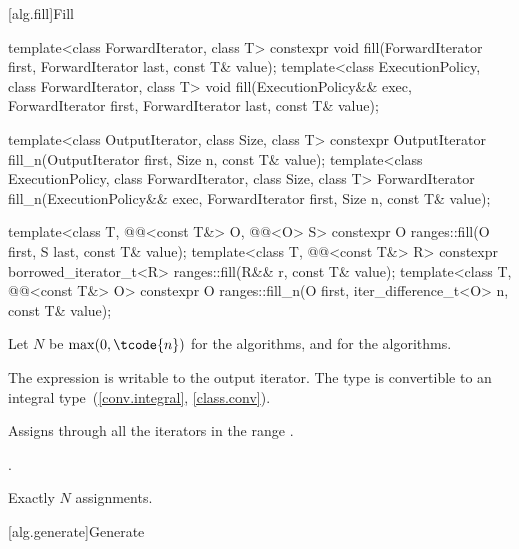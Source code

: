 [alg.fill]{Fill}

%
%
\begin{itemdecl}
template<class ForwardIterator, class T>
  constexpr void fill(ForwardIterator first, ForwardIterator last, const T& value);
template<class ExecutionPolicy, class ForwardIterator, class T>
  void fill(ExecutionPolicy&& exec,
            ForwardIterator first, ForwardIterator last, const T& value);

template<class OutputIterator, class Size, class T>
  constexpr OutputIterator fill_n(OutputIterator first, Size n, const T& value);
template<class ExecutionPolicy, class ForwardIterator, class Size, class T>
  ForwardIterator fill_n(ExecutionPolicy&& exec,
                         ForwardIterator first, Size n, const T& value);


template<class T, @@<const T&> O, @@<O> S>
  constexpr O ranges::fill(O first, S last, const T& value);
template<class T, @@<const T&> R>
  constexpr borrowed_iterator_t<R> ranges::fill(R&& r, const T& value);
template<class T, @@<const T&> O>
  constexpr O ranges::fill_n(O first, iter_difference_t<O> n, const T& value);
\end{itemdecl}

\begin{itemdescr}
\pnum
Let $N$ be $\max(0, \tcode{n})$ for the  algorithms, and
 for the  algorithms.

\pnum
\mandates
The expression 
is writable to the output iterator.
The type  is convertible
to an integral type~(\ref{conv.integral}, \ref{class.conv}).

\pnum
\effects
Assigns 
through all the iterators in the range .

\pnum
\returns
{}.

\pnum
\complexity
Exactly $N$ assignments.
\end{itemdescr}

[alg.generate]{Generate}

